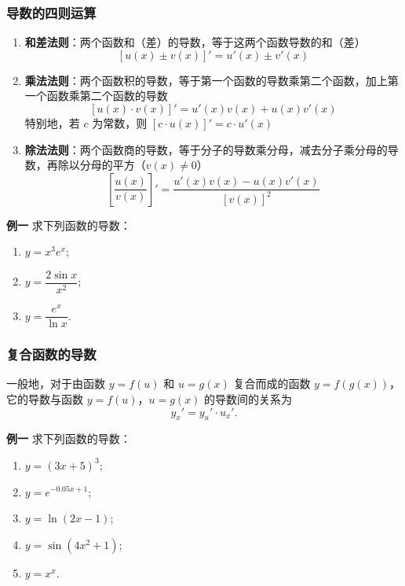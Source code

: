 \documentclass{article}
\begin{document}
\subsubsection{导数的四则运算}
\begin{enumerate}
    \item \textbf{和差法则}：两个函数和（差）的导数，等于这两个函数导数的和（差）
    \[
    [u(x) \pm v(x)]' = u'(x) \pm v'(x)
    \]

    \item \textbf{乘法法则}：两个函数积的导数，等于第一个函数的导数乘第二个函数，加上第一个函数乘第二个函数的导数
    \[
    [u(x) \cdot v(x)]' = u'(x)v(x) + u(x)v'(x)
    \]
    特别地，若 \(c\) 为常数，则 \( [c \cdot u(x)]' = c \cdot u'(x) \)

    \item \textbf{除法法则}：两个函数商的导数，等于分子的导数乘分母，减去分子乘分母的导数，再除以分母的平方（\(v(x) \neq 0\)）
    \[
    \left[\frac{u(x)}{v(x)}\right]' = \frac{u'(x)v(x) - u(x)v'(x)}{[v(x)]^2}
    \]
\end{enumerate}

\noindent \textbf{例一} \;\;求下列函数的导数：

\begin{enumerate}
    \item \(y = x^3 e^x\);
    \item \(y = \dfrac{2\sin x}{x^2}\);
    \item \(y = \dfrac{e^x}{\ln x}\).
\end{enumerate}
\subsubsection{复合函数的导数}

一般地，对于由函数 \(y = f(u)\) 和 \(u = g(x)\) 复合而成的函数 \(y = f(g(x))\)，它的导数与函数 \(y = f(u)\)，\(u = g(x)\) 的导数间的关系为
\[
\boxed{y_x' = y_u' \cdot u_x'.}
\]

\noindent \textbf{例一} \;\;求下列函数的导数：

\begin{enumerate}
    \item \(y = (3x + 5)^3\);
    \item \(y = e^{-0.05x + 1}\);
    \item \(y = \ln(2x - 1)\);
    \item \(y = \sin(4x^2 + 1)\);
    \item \(y = x^x\).  
\end{enumerate}
\end{document}
